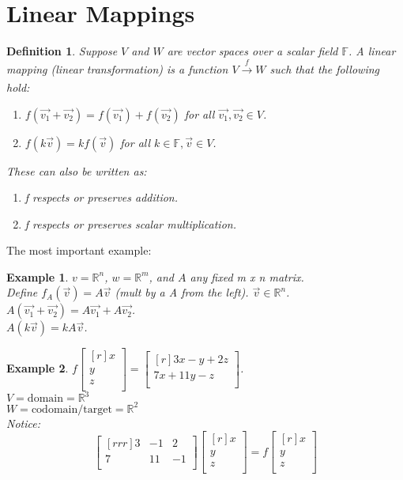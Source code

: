 \documentclass{report}
\newtheorem*{ex}{Example}
\newtheorem*{defn}{Definition}
\begin{document}
\section{Linear Mappings}
\begin{defn}
Suppose $V$ and $W$ are vector spaces over a scalar field $\mathbb{F}$. A linear mapping (linear transformation) is a function $V\xrightarrow[]{f} W$ such that the following hold:
\begin{enumerate}
\item $f(\vec{v_1}+\vec{v_2}) = f(\vec{v_1}) + f(\vec{v_2}) $ for all $\vec{v_1},\vec{v_2}\in V$.
\item $f(k\vec{v}) = kf(\vec{v})$ for all $k\in \mathbb{F}, \vec{v}\in V$.
\end{enumerate}
These can also be written as:
\begin{enumerate}
\item f respects or preserves addition.
\item f respects or preserves scalar multiplication.
\end{enumerate}
\end{defn}
The most important example:
\begin{ex}
$v=\mathbb{R}^n$, $w=\mathbb{R}^m$, and $A$ any fixed m x n matrix.\\
Define $f_A(\vec{v}) = A\vec{v}$ (mult by a A from the left). $\vec{v} \in \mathbb{R}^n$.\\
$A(\vec{v_1}+\vec{v_2}) = A\vec{v_1}+A\vec{v_2}$.\\
$A(k\vec{v})=kA\vec{v}$.
\end{ex}
\begin{ex}
$f\begin{bmatrix}[r]x\\y\\z\\\end{bmatrix} = \begin{bmatrix}[r]3x-y+2z\\7x+11y-z\\\end{bmatrix}$. \\
$V = \mathrm{domain} = \mathbb{R}^3$\\
$W= \mathrm{codomain/target} = \mathbb{R}^2$\\
Notice:
\[ \begin{bmatrix}[rrr]3&-1&2\\7&11&-1\\\end{bmatrix}\begin{bmatrix}[r]x\\y\\z\\\end{bmatrix}=f\begin{bmatrix}[r]x\\y\\z\\\end{bmatrix}
 \]
\end{ex}
\end{document}
